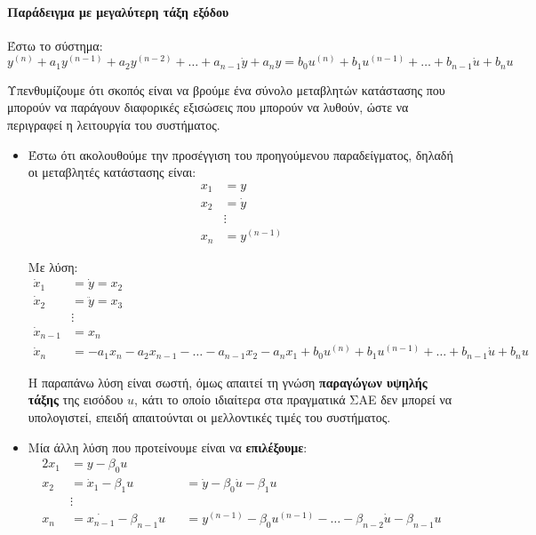 \documentclass[11pt,a4paper,notitlepage,fleqn,final]{article}
\begin{document}
\paragraph{Παράδειγμα με μεγαλύτερη τάξη εξόδου}
\label{sec:nontd_highorder_system}
Έστω το σύστημα:
\[
y^{(n)} + a_1y^{(n-1)} + a_2y^{(n-2)} + \dots + a_{n-1}\dot y + a_n y =
b_0 u^{(n)} + b_1u^{(n-1)} + \dots + b_{n-1}\dot u + b_n u
\label{eq:nontd_highorder_system}
\]

Υπενθυμίζουμε ότι σκοπός είναι να βρούμε ένα σύνολο μεταβλητών κατάστασης που μπορούν
να παράγουν διαφορικές εξισώσεις που μπορούν να λυθούν, ώστε να περιγραφεί η λειτουργία του
συστήματος.

\begin{itemize}
	\item Έστω ότι ακολουθούμε την προσέγγιση του προηγούμενου παραδείγματος, δηλαδή οι
	μεταβλητές κατάστασης είναι:
	\begin{align*}
	x_1 &= y \\
	x_2 &= \dot y \\
	&\vdots \\
	x_n &= y^{(n-1)}
	\end{align*}
	
	Με λύση:
	\begin{align*}
	\dot x_1 &= \dot y = x_2\\
	\dot x_2 &= \ddot y = x_3 \\
	&\vdots \\
	\dot x_{n-1} &= x_n\\
	\dot x_n &= -a_1x_n -a_2x_{n-1} - \dots - a_{n-1}x_2 -a_nx_1 + b_0 u^{(n)} + b_1u^{(n-1)} + \dots + b_{n-1}\dot u + b_n u
	\end{align*}

     Η παραπάνω λύση είναι σωστή, όμως απαιτεί τη γνώση \textbf{παραγώγων υψηλής τάξης} της
     εισόδου \( u \), κάτι το οποίο ιδιαίτερα στα πραγματικά ΣΑΕ δεν μπορεί να υπολογιστεί,
     επειδή απαιτούνται οι μελλοντικές τιμές του συστήματος.
     \item Μία άλλη λύση που προτείνουμε είναι να \textbf{επιλέξουμε}:
     \begin{alignat*}{2}
     	x_1 &= y - \beta_0 u && \\
     	x_2 &= \dot x_1 - \beta_1 u &&= \dot y - \beta_0\dot u - \beta_1u \\
     	&\vdots && \\
     	x_n &= \dot{x_{n-1}} - \beta_{n-1}u
     	&&= y^{(n-1)} - \beta_0u^{(n-1)} - \dots - \beta_{n-2}\dot u - \beta_{n-1}u
     \end{alignat*}
     

\end{itemize}
\end{document}
